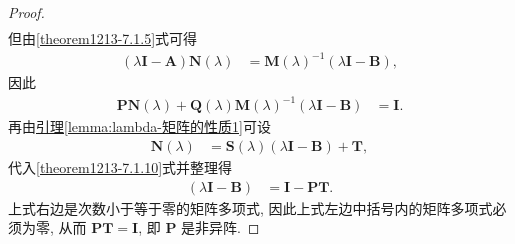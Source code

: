 \documentclass[../../main.tex]{subfiles}%
\begin{document}
\begin{proof}
\begin{align*}
\end{align*}
但由\eqref{theorem1213-7.1.5}式可得
\begin{align*}
(\lambda\boldsymbol{I}-\boldsymbol{A})\boldsymbol{N}(\lambda)&=\boldsymbol{M}(\lambda)^{-1}(\lambda\boldsymbol{I}-\boldsymbol{B}),
\end{align*}
因此
\begin{align}
\boldsymbol{P}\boldsymbol{N}(\lambda)+\boldsymbol{Q}(\lambda)\boldsymbol{M}(\lambda)^{-1}(\lambda\boldsymbol{I}-\boldsymbol{B})&=\boldsymbol{I}. \label{theorem1213-7.1.10}
\end{align}
再由\hyperref[lemma:lambda-矩阵的性质1]{引理\ref{lemma:lambda-矩阵的性质1}}可设
\begin{align*}
\boldsymbol{N}(\lambda)&=\boldsymbol{S}(\lambda)(\lambda\boldsymbol{I}-\boldsymbol{B})+\boldsymbol{T},
\end{align*}
代入\eqref{theorem1213-7.1.10}式并整理得
\begin{align*}
[\boldsymbol{P}\boldsymbol{S}(\lambda)+\boldsymbol{Q}(\lambda)\boldsymbol{M}(\lambda)^{-1}](\lambda\boldsymbol{I}-\boldsymbol{B})&=\boldsymbol{I}-\boldsymbol{P}\boldsymbol{T}.
\end{align*}
上式右边是次数小于等于零的矩阵多项式, 因此上式左边中括号内的矩阵多项式必须为零, 从而 $\boldsymbol{P}\boldsymbol{T}=\boldsymbol{I}$, 即 $\boldsymbol{P}$ 是非异阵.
\end{proof}
\end{document}
